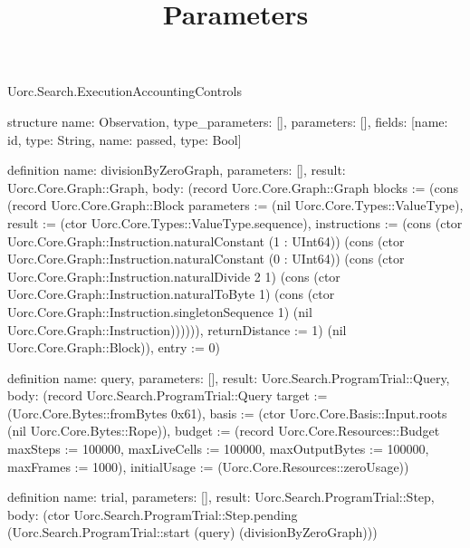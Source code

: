 \begin{lexlean}{Uorc.Search.ExecutionAccountingControls}
\title{Parameters}
\begin{semanticmodule}
structure{
  name: Observation,
  type_parameters: [],
  parameters: [],
  fields: [{name: id, type: String}, {name: passed, type: Bool}]
}

definition{
  name: divisionByZeroGraph,
  parameters: [],
  result: Uorc.Core.Graph::Graph,
  body: (record Uorc.Core.Graph::Graph {blocks := (cons (record Uorc.Core.Graph::Block {parameters := (nil Uorc.Core.Types::ValueType), result := (ctor Uorc.Core.Types::ValueType.sequence), instructions := (cons (ctor Uorc.Core.Graph::Instruction.naturalConstant (1 : UInt64)) (cons (ctor Uorc.Core.Graph::Instruction.naturalConstant (0 : UInt64)) (cons (ctor Uorc.Core.Graph::Instruction.naturalDivide 2 1) (cons (ctor Uorc.Core.Graph::Instruction.naturalToByte 1) (cons (ctor Uorc.Core.Graph::Instruction.singletonSequence 1) (nil Uorc.Core.Graph::Instruction)))))), returnDistance := 1}) (nil Uorc.Core.Graph::Block)), entry := 0})
}

definition{
  name: query,
  parameters: [],
  result: Uorc.Search.ProgramTrial::Query,
  body: (record Uorc.Search.ProgramTrial::Query {target := (Uorc.Core.Bytes::fromBytes 0x61), basis := (ctor Uorc.Core.Basis::Input.roots (nil Uorc.Core.Bytes::Rope)), budget := (record Uorc.Core.Resources::Budget {maxSteps := 100000, maxLiveCells := 100000, maxOutputBytes := 100000, maxFrames := 1000}), initialUsage := (Uorc.Core.Resources::zeroUsage)})
}

definition{
  name: trial,
  parameters: [],
  result: Uorc.Search.ProgramTrial::Step,
  body: (ctor Uorc.Search.ProgramTrial::Step.pending (Uorc.Search.ProgramTrial::start (query) (divisionByZeroGraph)))
}


\end{semanticmodule}
\end{lexlean}
